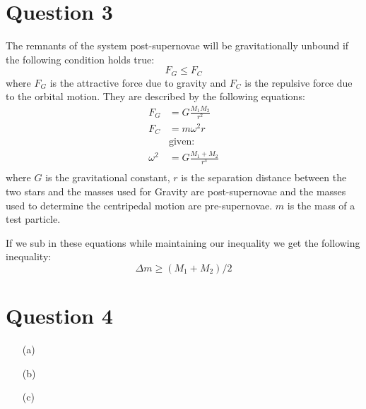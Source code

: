 \documentclass[10pt,a4paper]{article}
\begin{document}
\section*{Question 3}
The remnants of the system post-supernovae will be gravitationally unbound if the following condition holds true:
\begin{equation*}
    F_{G} \leq F_{C}
\end{equation*}
where $F_{G}$ is the attractive force due to gravity and $F_{C}$ is the repulsive force due to the orbital motion. They are described by the following equations:
\begin{align*}
    F_{G} &= G\frac{M_{1}M_{2}}{r^{2}} \\
    F_{C} &= m\omega^{2}r \\
    &\mbox{given:} \\
    \omega^{2} &= G\frac{M_{1}+M_{2}}{r^{3}} \\
\end{align*}
where $G$ is the gravitational constant, $r$ is the separation distance between the two stars and the masses used for Gravity are post-supernovae and the masses used to determine the centripedal motion are pre-supernovae. $m$ is the mass of a test particle.

If we sub in these equations while maintaining our inequality we get the following inequality:
\begin{equation*}
    \Delta m \geq (M_{1}+M_{2})/2
\end{equation*}

\section*{Question 4}
\begin{itemize}
    \item[(a)]
    \item[(b)]
    \item[(c)]
\end{itemize}
\end{document}
